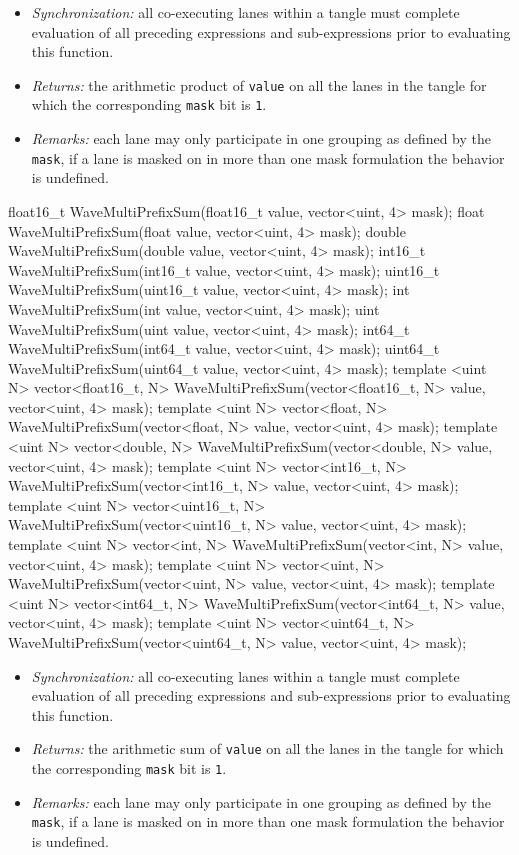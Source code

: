 \begin{itemize}
  \item \textit{Synchronization:} all co-executing \gls{lane}s within a \gls{tangle}
  must complete evaluation of all preceding expressions and sub-expressions
  prior to evaluating this function.
  \item \textit{Returns:} the arithmetic product of \texttt{value} on all the
  \gls{lane}s in the \gls{tangle} for which the corresponding \texttt{mask} bit
  is \texttt{1}.
  \item \textit{Remarks:} each \gls{lane} may only participate in one grouping
  as defined by the \texttt{mask}, if a \gls{lane} is masked on in more than one
  mask formulation the behavior is undefined.
\end{itemize}

\begin{HLSL}
float16_t WaveMultiPrefixSum(float16_t value, vector<uint, 4> mask);
float WaveMultiPrefixSum(float value, vector<uint, 4> mask);
double WaveMultiPrefixSum(double value, vector<uint, 4> mask);
int16_t WaveMultiPrefixSum(int16_t value, vector<uint, 4> mask);
uint16_t WaveMultiPrefixSum(uint16_t value, vector<uint, 4> mask);
int WaveMultiPrefixSum(int value, vector<uint, 4> mask);
uint WaveMultiPrefixSum(uint value, vector<uint, 4> mask);
int64_t WaveMultiPrefixSum(int64_t value, vector<uint, 4> mask);
uint64_t WaveMultiPrefixSum(uint64_t value, vector<uint, 4> mask);
template <uint N>
vector<float16_t, N> WaveMultiPrefixSum(vector<float16_t, N> value, vector<uint, 4> mask);
template <uint N>
vector<float, N> WaveMultiPrefixSum(vector<float, N> value, vector<uint, 4> mask);
template <uint N>
vector<double, N> WaveMultiPrefixSum(vector<double, N> value, vector<uint, 4> mask);
template <uint N>
vector<int16_t, N> WaveMultiPrefixSum(vector<int16_t, N> value, vector<uint, 4> mask);
template <uint N>
vector<uint16_t, N> WaveMultiPrefixSum(vector<uint16_t, N> value, vector<uint, 4> mask);
template <uint N>
vector<int, N> WaveMultiPrefixSum(vector<int, N> value, vector<uint, 4> mask);
template <uint N>
vector<uint, N> WaveMultiPrefixSum(vector<uint, N> value, vector<uint, 4> mask);
template <uint N>
vector<int64_t, N> WaveMultiPrefixSum(vector<int64_t, N> value, vector<uint, 4> mask);
template <uint N>
vector<uint64_t, N> WaveMultiPrefixSum(vector<uint64_t, N> value, vector<uint, 4> mask);
\end{HLSL}

\begin{itemize}
  \item \textit{Synchronization:} all co-executing \gls{lane}s within a \gls{tangle}
  must complete evaluation of all preceding expressions and sub-expressions
  prior to evaluating this function.
  \item \textit{Returns:} the arithmetic sum of \texttt{value} on all the
  \gls{lane}s in the \gls{tangle} for which the corresponding \texttt{mask} bit
  is \texttt{1}.
  \item \textit{Remarks:} each \gls{lane} may only participate in one grouping
  as defined by the \texttt{mask}, if a \gls{lane} is masked on in more than one
  mask formulation the behavior is undefined.
\end{itemize}

